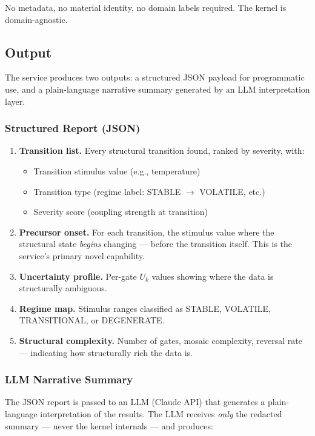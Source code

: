 \documentclass[11pt,letterpaper]{article}
\begin{document}
No metadata, no material identity, no domain labels required. The kernel
is domain-agnostic.

\subsection{Output}

The service produces two outputs: a structured JSON payload for
programmatic use, and a plain-language narrative summary generated
by an LLM interpretation layer.

\subsubsection{Structured Report (JSON)}

\begin{enumerate}
  \item \textbf{Transition list.} Every structural transition found,
    ranked by severity, with:
    \begin{itemize}
      \item Transition stimulus value (e.g., temperature)
      \item Transition type (regime label: STABLE $\to$ VOLATILE, etc.)
      \item Severity score (coupling strength at transition)
    \end{itemize}
  \item \textbf{Precursor onset.} For each transition, the stimulus
    value where the structural state \emph{begins} changing --- before
    the transition itself. This is the service's primary novel capability.
  \item \textbf{Uncertainty profile.} Per-gate $U_k$ values showing
    where the data is structurally ambiguous.
  \item \textbf{Regime map.} Stimulus ranges classified as STABLE,
    VOLATILE, TRANSITIONAL, or DEGENERATE.
  \item \textbf{Structural complexity.} Number of gates, mosaic
    complexity, reversal rate --- indicating how structurally rich the
    data is.
\end{enumerate}

\subsubsection{LLM Narrative Summary}

The JSON report is passed to an LLM (Claude API) that generates a
plain-language interpretation of the results. The LLM receives
\emph{only} the redacted summary --- never the kernel internals ---
and produces:
\end{document}
